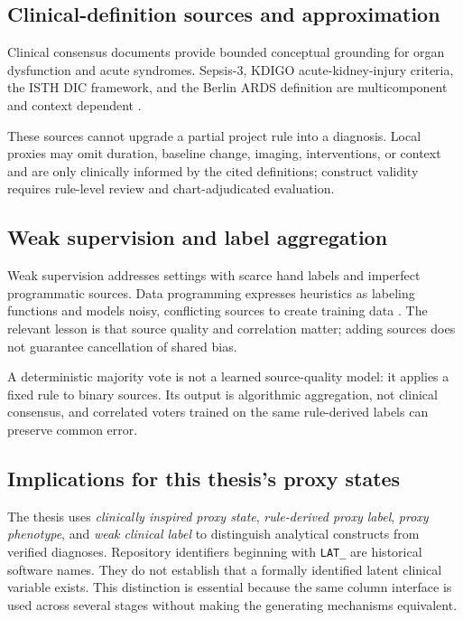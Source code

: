 \subsection{Clinical-definition sources and approximation}

Clinical consensus documents provide bounded conceptual grounding for organ dysfunction and acute syndromes.  Sepsis-3, KDIGO acute-kidney-injury criteria, the ISTH DIC framework, and the Berlin ARDS definition are multicomponent and context dependent \cite{singer_2016_sepsis3,kdigo_2012_acute_kidney_injury,taylor_et_al_2001_isth_dic,ranieri_et_al_2012_berlin_ards}.

These sources cannot upgrade a partial project rule into a diagnosis.  Local proxies may omit duration, baseline change, imaging, interventions, or context and are only clinically informed by the cited definitions; construct validity requires rule-level review and chart-adjudicated evaluation.

\subsection{Weak supervision and label aggregation}

Weak supervision addresses settings with scarce hand labels and imperfect programmatic sources.  Data programming expresses heuristics as labeling functions and models noisy, conflicting sources to create training data \cite{ratner_et_al_2016_data_programming}.  The relevant lesson is that source quality and correlation matter; adding sources does not guarantee cancellation of shared bias.

A deterministic majority vote is not a learned source-quality model: it applies a fixed rule to binary sources.  Its output is algorithmic aggregation, not clinical consensus, and correlated voters trained on the same rule-derived labels can preserve common error.

\subsection{Implications for this thesis's proxy states}

The thesis uses \emph{clinically inspired proxy state}, \emph{rule-derived proxy label}, \emph{proxy phenotype}, and \emph{weak clinical label} to distinguish analytical constructs from verified diagnoses.  Repository identifiers beginning with \texttt{LAT\_} are historical software names.  They do not establish that a formally identified latent clinical variable exists.  This distinction is essential because the same column interface is used across several stages without making the generating mechanisms equivalent.

